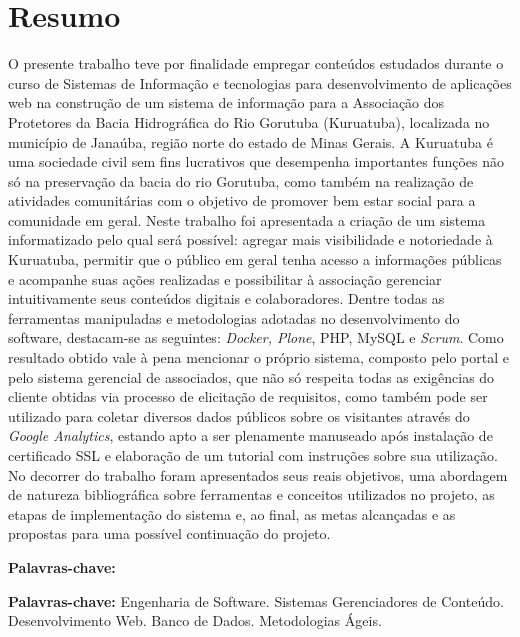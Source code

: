 \chapter*{Resumo}

\vspace{0.4cm}

\noindent O presente trabalho teve por finalidade empregar conteúdos estudados durante o curso de Sistemas de Informação e tecnologias para desenvolvimento de aplicações web na construção de um sistema de informação para a Associação dos Protetores da Bacia Hidrográfica do Rio Gorutuba (Kuruatuba), localizada no município de Janaúba, região norte do estado de Minas Gerais. 
A Kuruatuba é uma sociedade civil sem fins lucrativos que desempenha importantes funções não só na preservação da bacia do rio Gorutuba, como também na realização de atividades comunitárias com o objetivo de promover bem estar social para a comunidade em geral. 
Neste trabalho foi apresentada a criação de um sistema informatizado pelo qual será possível: agregar mais visibilidade e notoriedade à Kuruatuba, permitir que o público em geral tenha acesso a informações públicas e acompanhe suas ações realizadas e possibilitar à associação gerenciar intuitivamente seus conteúdos digitais e colaboradores.  
Dentre todas as ferramentas manipuladas e metodologias adotadas no desenvolvimento do software, destacam-se as seguintes: \textit{Docker, Plone}, PHP, MySQL e \textit{Scrum}.
Como resultado obtido vale à pena mencionar o próprio sistema, composto pelo portal e pelo sistema gerencial de associados, que não só respeita todas as exigências do cliente obtidas via processo de elicitação de requisitos, como também pode ser utilizado para coletar diversos dados públicos sobre os visitantes através do \textit{Google Analytics}, estando apto a ser plenamente manuseado após instalação de certificado SSL e elaboração de um tutorial com instruções sobre sua utilização.
No decorrer do trabalho foram apresentados seus reais objetivos, uma abordagem de natureza bibliográfica sobre ferramentas e conceitos utilizados no projeto, as etapas de implementação do sistema e, ao final, as metas alcançadas e as propostas para uma possível continuação do projeto.

\begin{labeling}{\textbf{Palavras-chave:}}
\item[\textbf{Palavras-chave:}] 
Engenharia de Software.
Sistemas Gerenciadores de Conteúdo.
Desenvolvimento Web.
Banco de Dados.
Metodologias Ágeis.
\end{labeling}

